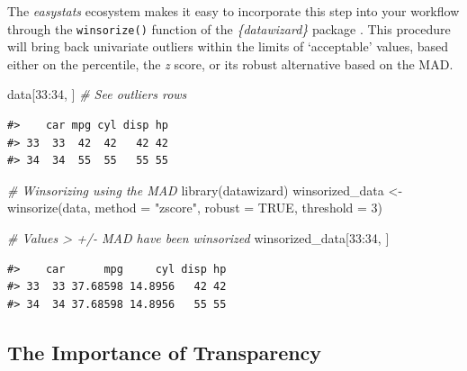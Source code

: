 \documentclass[mathematics,article,submit,moreauthors,pdftex]{mdpi}
\newenvironment{Shaded}{\begin{snugshade}}{\end{snugshade}}
\newcommand{\AttributeTok}[1]{\textcolor[rgb]{0.77,0.63,0.00}{#1}}
\newcommand{\CommentTok}[1]{\textcolor[rgb]{0.56,0.35,0.01}{\textit{#1}}}
\newcommand{\ConstantTok}[1]{\textcolor[rgb]{0.00,0.00,0.00}{#1}}
\newcommand{\DecValTok}[1]{\textcolor[rgb]{0.00,0.00,0.81}{#1}}
\newcommand{\FunctionTok}[1]{\textcolor[rgb]{0.00,0.00,0.00}{#1}}
\newcommand{\NormalTok}[1]{#1}
\newcommand{\OtherTok}[1]{\textcolor[rgb]{0.56,0.35,0.01}{#1}}
\newcommand{\SpecialCharTok}[1]{\textcolor[rgb]{0.00,0.00,0.00}{#1}}
\newcommand{\StringTok}[1]{\textcolor[rgb]{0.31,0.60,0.02}{#1}}
\begin{document}
The \emph{easystats} ecosystem makes it easy to incorporate this step
into your workflow through the \texttt{winsorize()} function of the
\emph{\{datawizard\}} package \citep{patil2022datawizard}. This
procedure will bring back univariate outliers within the limits of
`acceptable' values, based either on the percentile, the \emph{z} score,
or its robust alternative based on the MAD.

\begin{Shaded}
\begin{Highlighting}[]
\NormalTok{data[}\DecValTok{33}\SpecialCharTok{:}\DecValTok{34}\NormalTok{, ]  }\CommentTok{\# See outliers rows}
\end{Highlighting}
\end{Shaded}

\begin{verbatim}
#>    car mpg cyl disp hp
#> 33  33  42  42   42 42
#> 34  34  55  55   55 55
\end{verbatim}

\begin{Shaded}
\begin{Highlighting}[]
\CommentTok{\# Winsorizing using the MAD}
\FunctionTok{library}\NormalTok{(datawizard)}
\NormalTok{winsorized\_data }\OtherTok{\textless{}{-}} \FunctionTok{winsorize}\NormalTok{(data, }\AttributeTok{method =} \StringTok{"zscore"}\NormalTok{, }\AttributeTok{robust =} \ConstantTok{TRUE}\NormalTok{, }\AttributeTok{threshold =} \DecValTok{3}\NormalTok{)}

\CommentTok{\# Values \textgreater{} +/{-} MAD have been winsorized}
\NormalTok{winsorized\_data[}\DecValTok{33}\SpecialCharTok{:}\DecValTok{34}\NormalTok{, ]}
\end{Highlighting}
\end{Shaded}

\begin{verbatim}
#>    car      mpg     cyl disp hp
#> 33  33 37.68598 14.8956   42 42
#> 34  34 37.68598 14.8956   55 55
\end{verbatim}

\hypertarget{the-importance-of-transparency}{%
\subsection{The Importance of
Transparency}\label{the-importance-of-transparency}}
\end{document}
